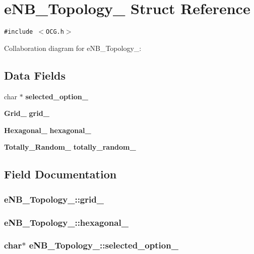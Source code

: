 \section{eNB\_\-Topology\_\- Struct Reference}
\label{structeNB__Topology__}
{\tt \#include $<$OCG.h$>$}

Collaboration diagram for eNB\_\-Topology\_\-:\subsection*{Data Fields}
\begin{CompactItemize}
\item 
char $\ast$ {\bf selected\_\-option\_\-}
\item 
{\bf Grid\_\-} {\bf grid\_\-}
\item 
{\bf Hexagonal\_\-} {\bf hexagonal\_\-}
\item 
{\bf Totally\_\-Random\_\-} {\bf totally\_\-random\_\-}
\end{CompactItemize}


\subsection{Field Documentation}
\subsubsection[{grid\_\-}]{ {\bf eNB\_\-Topology\_\-::grid\_\-}}\label{structeNB__Topology___43e51d8edb19a7d60814a334575d7be7}


\subsubsection[{hexagonal\_\-}]{ {\bf eNB\_\-Topology\_\-::hexagonal\_\-}}\label{structeNB__Topology___5fedc111dd735199d5338f506b09e353}


\subsubsection[{selected\_\-option\_\-}]{\setlength{\rightskip}{0pt plus 5cm}char$\ast$ {\bf eNB\_\-Topology\_\-::selected\_\-option\_\-}}\label{structeNB__Topology___53180c3c0ac4439d3c89736bf75753a3}


